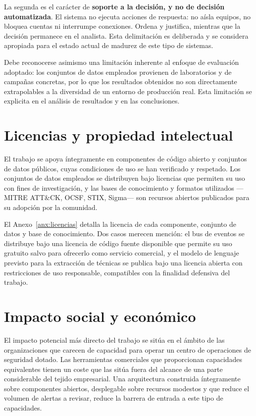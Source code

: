 La segunda es el carácter de \textbf{soporte a la decisión, y no de decisión automatizada}.
El sistema no ejecuta acciones de respuesta: no aísla equipos, no bloquea cuentas ni
interrumpe conexiones. Ordena y justifica, mientras que la decisión permanece en el analista.
Esta delimitación es deliberada y se considera apropiada para el estado actual de madurez de
este tipo de sistemas.

Debe reconocerse asimismo una limitación inherente al enfoque de evaluación adoptado: los
conjuntos de datos empleados provienen de laboratorios y de campañas concretas, por lo que
los resultados obtenidos no son directamente extrapolables a la diversidad de un entorno de
producción real. Esta limitación se explicita en el análisis de resultados y en las
conclusiones.

\section{Licencias y propiedad intelectual}

El trabajo se apoya íntegramente en componentes de código abierto y conjuntos de datos
públicos, cuyas condiciones de uso se han verificado y respetado. Los conjuntos de datos
empleados se distribuyen bajo licencias que permiten su uso con fines de investigación, y las
bases de conocimiento y formatos utilizados —MITRE ATT\&CK, OCSF, STIX, Sigma— son recursos
abiertos publicados para su adopción por la comunidad.

El Anexo~\ref{anx:licencias} detalla la licencia de cada componente, conjunto de datos y
base de conocimiento. Dos casos merecen mención: el bus de eventos se distribuye bajo una
licencia de código fuente disponible que permite su uso gratuito salvo para ofrecerlo como
servicio comercial, y el modelo de lenguaje previsto para la extracción de técnicas se
publica bajo una licencia abierta con restricciones de uso responsable, compatibles con la
finalidad defensiva del trabajo.

\section{Impacto social y económico}

El impacto potencial más directo del trabajo se sitúa en el ámbito de las organizaciones que
carecen de capacidad para operar un centro de operaciones de seguridad dotado. Las
herramientas comerciales que proporcionan capacidades equivalentes tienen un coste que las
sitúa fuera del alcance de una parte considerable del tejido empresarial. Una arquitectura
construida íntegramente sobre componentes abiertos, desplegable sobre recursos modestos y
que reduce el volumen de alertas a revisar, reduce la barrera de entrada a este tipo de
capacidades.

